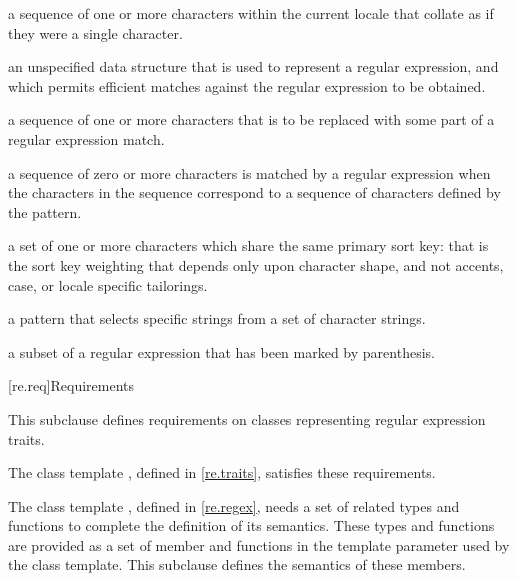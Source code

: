 %
%
a sequence of one or more characters within the
current locale that collate as if they were a single character.

%
an unspecified data structure that is used to
represent a regular expression, and which permits efficient matches
against the regular expression to be obtained.

%
a sequence of one or more characters that is to be
replaced with some part of a regular expression match.

%
%
a sequence of zero or more characters is matched by
a regular expression when the characters in the sequence
correspond to a sequence of characters defined by the pattern.

%
%
a set of one or more characters which
share the same primary sort key: that is the sort key weighting that
depends only upon character shape, and not accents, case, or
locale specific tailorings.

a pattern that selects specific strings
from a set of character strings.

%
a subset of a regular expression that has
been marked by parenthesis.

[re.req]{Requirements}

\pnum
This subclause defines requirements on classes representing regular
expression traits.  \begin{note} The class template
, defined in \ref{re.traits},
satisfies these requirements.  \end{note}

\pnum
The class template , defined in
\ref{re.regex}, needs a set of related types and
functions to complete the definition of its semantics. These types
and functions are provided as a set of member  and functions
in the template parameter  used by the  class
template. This subclause defines the semantics of these
members.

